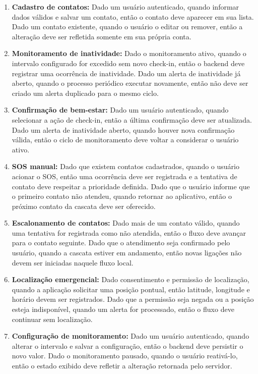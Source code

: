 \begin{enumerate}
\item \textbf{Cadastro de contatos:} Dado um usuário autenticado, quando informar dados válidos e salvar um contato, então o contato deve aparecer em sua lista. Dado um contato existente, quando o usuário o editar ou remover, então a alteração deve ser refletida somente em sua própria conta.
\item \textbf{Monitoramento de inatividade:} Dado o monitoramento ativo, quando o intervalo configurado for excedido sem novo check-in, então o backend deve registrar uma ocorrência de inatividade. Dado um alerta de inatividade já aberto, quando o processo periódico executar novamente, então não deve ser criado um alerta duplicado para o mesmo ciclo.
\item \textbf{Confirmação de bem-estar:} Dado um usuário autenticado, quando selecionar a ação de check-in, então a última confirmação deve ser atualizada. Dado um alerta de inatividade aberto, quando houver nova confirmação válida, então o ciclo de monitoramento deve voltar a considerar o usuário ativo.
\item \textbf{SOS manual:} Dado que existem contatos cadastrados, quando o usuário acionar o SOS, então uma ocorrência deve ser registrada e a tentativa de contato deve respeitar a prioridade definida. Dado que o usuário informe que o primeiro contato não atendeu, quando retornar ao aplicativo, então o próximo contato da cascata deve ser oferecido.
\item \textbf{Escalonamento de contatos:} Dado mais de um contato válido, quando uma tentativa for registrada como não atendida, então o fluxo deve avançar para o contato seguinte. Dado que o atendimento seja confirmado pelo usuário, quando a cascata estiver em andamento, então novas ligações não devem ser iniciadas naquele fluxo local.
\item \textbf{Localização emergencial:} Dado consentimento e permissão de localização, quando a aplicação solicitar uma posição pontual, então latitude, longitude e horário devem ser registrados. Dado que a permissão seja negada ou a posição esteja indisponível, quando um alerta for processado, então o fluxo deve continuar sem localização.
\item \textbf{Configuração de monitoramento:} Dado um usuário autenticado, quando alterar o intervalo e salvar a configuração, então o backend deve persistir o novo valor. Dado o monitoramento pausado, quando o usuário reativá-lo, então o estado exibido deve refletir a alteração retornada pelo servidor.

\end{enumerate}
